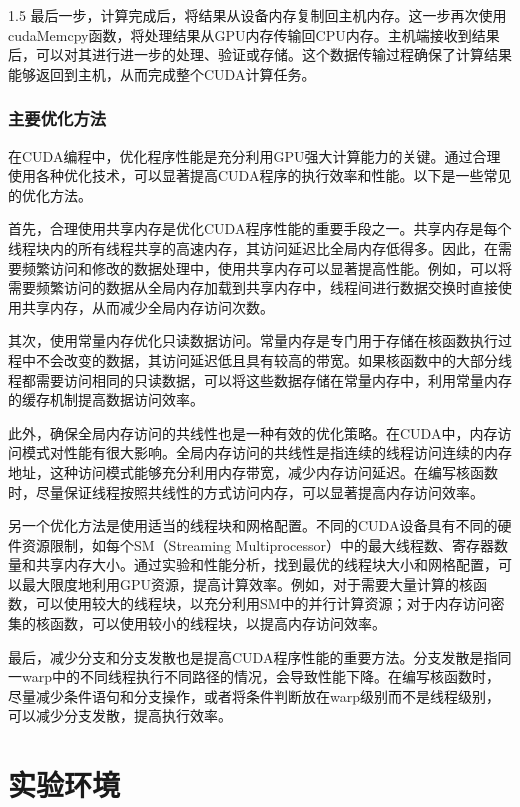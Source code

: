 \documentclass[zihao=-4]{ctexart}
\begin{document}
\begin{spacing}{1.5}
最后一步，计算完成后，将结果从设备内存复制回主机内存。这一步再次使用cudaMemcpy函数，将处理结果从GPU内存传输回CPU内存。主机端接收到结果后，可以对其进行进一步的处理、验证或存储。这个数据传输过程确保了计算结果能够返回到主机，从而完成整个CUDA计算任务。

\subsubsection{主要优化方法}

在CUDA编程中，优化程序性能是充分利用GPU强大计算能力的关键。通过合理使用各种优化技术，可以显著提高CUDA程序的执行效率和性能。以下是一些常见的优化方法。

首先，合理使用共享内存是优化CUDA程序性能的重要手段之一。共享内存是每个线程块内的所有线程共享的高速内存，其访问延迟比全局内存低得多。因此，在需要频繁访问和修改的数据处理中，使用共享内存可以显著提高性能。例如，可以将需要频繁访问的数据从全局内存加载到共享内存中，线程间进行数据交换时直接使用共享内存，从而减少全局内存访问次数。

其次，使用常量内存优化只读数据访问。常量内存是专门用于存储在核函数执行过程中不会改变的数据，其访问延迟低且具有较高的带宽。如果核函数中的大部分线程都需要访问相同的只读数据，可以将这些数据存储在常量内存中，利用常量内存的缓存机制提高数据访问效率。

此外，确保全局内存访问的共线性也是一种有效的优化策略。在CUDA中，内存访问模式对性能有很大影响。全局内存访问的共线性是指连续的线程访问连续的内存地址，这种访问模式能够充分利用内存带宽，减少内存访问延迟。在编写核函数时，尽量保证线程按照共线性的方式访问内存，可以显著提高内存访问效率。

另一个优化方法是使用适当的线程块和网格配置。不同的CUDA设备具有不同的硬件资源限制，如每个SM（Streaming Multiprocessor）中的最大线程数、寄存器数量和共享内存大小。通过实验和性能分析，找到最优的线程块大小和网格配置，可以最大限度地利用GPU资源，提高计算效率。例如，对于需要大量计算的核函数，可以使用较大的线程块，以充分利用SM中的并行计算资源；对于内存访问密集的核函数，可以使用较小的线程块，以提高内存访问效率。

最后，减少分支和分支发散也是提高CUDA程序性能的重要方法。分支发散是指同一warp中的不同线程执行不同路径的情况，会导致性能下降。在编写核函数时，尽量减少条件语句和分支操作，或者将条件判断放在warp级别而不是线程级别，可以减少分支发散，提高执行效率。

\section{实验环境}


\end{spacing}
\end{document}
